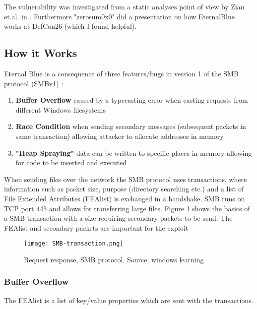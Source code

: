 \documentclass[
	letterpaper, %
	10pt, %
	unnumberedsections, %
	twoside, %
]{LTJournalArticle}
\begin{document}
The vulnerability was investigated from a static analyses point of view by Zian et.al. in \cite{Zian}. Furthermore "zerosum0x0" did a presentation on how EternalBlue works at DefCon26 \cite{zerosum0x0-defcon26} (which I found helpful). \\

\subsection{How it Works}
Eternal Blue is a consequence of three features/bugs in version 1 of the SMB protocol (SMBv1) \cite{Koczwara-medium} : 

\begin{enumerate}
	\item{ \textbf{Buffer Overflow} caused by a typecasting error when casting requests from different Windows filesystems}
	\item{ \textbf{Race Condition} when sending secondary messages (subsequent packets in same transaction) allowing attacker to allocate addresses in memory}
	\item{ \textbf{"Heap Spraying"} data can be written to specific places in memory allowing for code to be inserted and executed}
\end{enumerate}


When sending files over the network the SMB protocol uses transactions, where information such as packet size, purpose (directory searching etc.) and a list of File Extended Attributes (FEAlist) is exchanged in a handshake. SMB runs on TCP port 445 and allows for transferring large files. Figure \ref{fig:SMB-transaction} shows the basics of a SMB transaction with a size requiring secondary packets to be send. 
\newline
The FEAlist and secondary packets are important for the exploit


\begin{figure} %
	\texttt{[image: SMB-transaction.png]}
	\caption{Request response, SMB protocol. Source: windows learning }
	\label{fig:SMB-transaction}
\end{figure}

\subsubsection{Buffer Overflow}
The FEAlist is a list of key/value properties which are sent with the transactions. 
\end{document}
